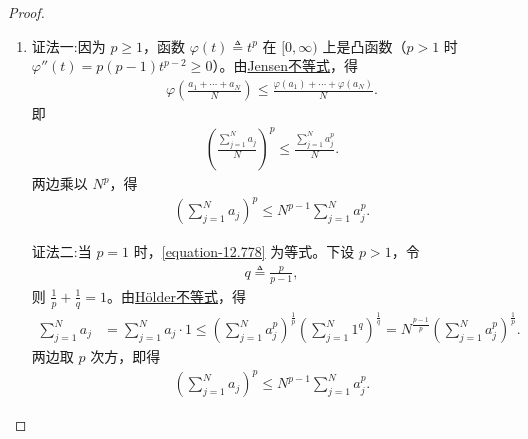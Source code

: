 \documentclass[../../main.tex]{subfiles}%
\begin{document}
\begin{proof}
\begin{enumerate}[(1)]
\item {\color{blue}证法一:}因为 $p\geqslant1$，函数 $\varphi(t)\triangleq t^p$ 在 $[0,\infty)$ 上是凸函数（$p>1$ 时 $\varphi''(t)=p(p-1)t^{p-2}\geqslant0$）。由\hyperref[theorem:Jensen不等式1111]{Jensen不等式}，得
\begin{align*}
\varphi\left(\frac{a_1+\cdots+a_N}{N}\right)
\leqslant
\frac{\varphi(a_1)+\cdots+\varphi(a_N)}{N}.
\end{align*}
即
\begin{align*}
\left(\frac{\sum\limits_{j=1}^{N}a_j}{N}\right)^p
\leqslant
\frac{\sum\limits_{j=1}^{N}a_j^p}{N}.
\end{align*}
两边乘以 $N^p$，得
\begin{align*}
\left(\sum\limits_{j=1}^{N}a_j\right)^p
\leqslant
N^{p-1}\sum\limits_{j=1}^{N}a_j^p.
\end{align*}

{\color{blue}证法二:}当 $p=1$ 时，\eqref{equation-12.778} 为等式。下设 $p>1$，令
\begin{align*}
q\triangleq\frac{p}{p-1},
\end{align*}
则 $\frac1p+\frac1q=1$。由\hyperref[theorem:离散的Hölder不等式]{Hölder不等式}，得
\begin{align*}
\sum\limits_{j=1}^{N}a_j
&=\sum\limits_{j=1}^{N}a_j\cdot1\leqslant
\left(\sum\limits_{j=1}^{N}a_j^{p}\right)^{\frac1p}
\left(\sum\limits_{j=1}^{N}1^{q}\right)^{\frac1q}=
N^{\frac{p-1}{p}}
\left(\sum\limits_{j=1}^{N}a_j^{p}\right)^{\frac1p}.
\end{align*}
两边取 $p$ 次方，即得
\begin{align*}
\left(\sum\limits_{j=1}^{N}a_j\right)^{p}
\leqslant
N^{p-1}\sum\limits_{j=1}^{N}a_j^{p}.
\end{align*}
\end{enumerate}
\end{proof}
\end{document}
